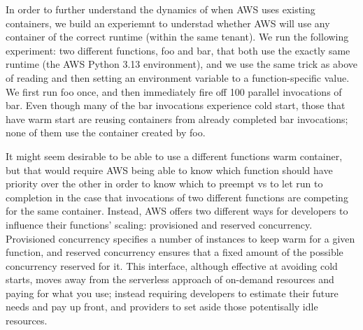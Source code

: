 In order to further understand the dynamics of when AWS uses existing
containers, we build an experiemnt to understad whether AWS will use any
container of the correct runtime (within the same tenant). We run the following
experiment: two different functions, foo and bar, that both use the exactly same
runtime (the AWS Python 3.13 environment), and we use the same trick as above of
reading and then setting an environment variable to a function-specific value.
We first run foo once, and then immediately fire off 100 parallel invocations of
bar. Even though many of the bar invocations experience cold start, those that
have warm start are reusing containers from already completed bar invocations;
none of them use the container created by foo. 

It might seem desirable to be able to use a different functions warm container,
but that would require AWS being able to know which function should have
priority over the other in order to know which to preempt vs to let run to
completion in the case that invocations of two different functions are competing
for the same container. Instead, AWS offers two different ways for developers to
influence their functions' scaling: provisioned and reserved
concurrency\cite{aws-scaling}. Provisioned concurrency specifies a number of
instances to keep warm for a given function, and reserved concurrency ensures
that a fixed amount of the possible concurrency reserved for it. This interface,
although effective at avoiding cold starts, moves away from the serverless
approach of on-demand resources and paying for what you use; instead requiring
developers to estimate their future needs and pay up front, and providers to set
aside those potentisally idle resources.



